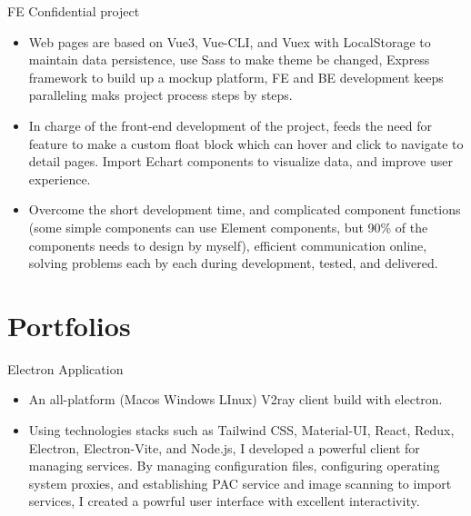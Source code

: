 \documentclass{resume}
\newcommand{\en}[1]{#1}
\newcommand{\zh}[1]{}
\begin{document}
\en{}
\zh{\datedsubsection{\textbf{{中科院自动化所}}}{2022/03 -- 2022/04}}
\en{FE Confidential project}
\zh{前端保密项目(外包)}
\begin{itemize}
      \item \en{Web pages are based on Vue3, Vue-CLI, and Vuex with LocalStorage to maintain data persistence, use Sass to make theme be changed, Express framework to build up a mockup platform, FE and BE development keeps paralleling maks project process steps by steps.}
            \zh{页面基于vue3，vue-cli，vuex搭配localstorage实现数据持久化，sass实现风格转换，express搭建mockup前端平台，前后端分离开发，快速迭代。}
      \item \en{In charge of the front-end development of the project, feeds the need for feature to make a custom float block which can hover and click to navigate to detail pages. Import Echart components to visualize data, and improve user experience.}
            \zh{负责前端页面开发，自定义悬浮方块组件并多处复用，满足内容导向功能，引入Echart图表，提高部分页面可视化功能，提高用户体验，解决用户痛点。}
      \item \en{Overcome the short development time, and complicated component functions (some simple components can use Element components, but 90\% of the components needs to design by myself), efficient communication online, solving problems each by each during development, tested, and delivered.}
            \zh{克服开发时间较短（2周），页面功能复杂（部分采用Element组件，页面功能90\%不可使用现有组件库），有效线上沟通，解决页面研发全流程问题，并测试且交付。}
\end{itemize}

\section{\en{Portfolios}\zh{个人项目}}
\en{Electron Application}
\zh{Electron Application}
\begin{itemize}
      \item \en{An all-platform (Macos Windows LInux) V2ray client build with electron.}
            \zh{跨平台的Electron 应用，用于管理并创建V2ray服务，实现网络代理。}
      \item \en{Using technologies stacks such as Tailwind CSS, Material-UI, React, Redux, Electron, Electron-Vite, and Node.js, I developed a powerful client for managing services. By managing configuration files, configuring operating system proxies, and establishing PAC service and image scanning to import services, I created a powrful user interface with excellent interactivity.}
            \zh{使用 Tailwindcss、Material-UI、React、Redux、Electron、Electron-Vite 和 Node.js 等技术，开发了一个功能强大的服务管理工具客户端。我通过管理配置文件、配置操作系统代理、建立 PAC 和图片扫描导入等服务，实现了交互良好的用户界面。}
\end{itemize}
\end{document}
